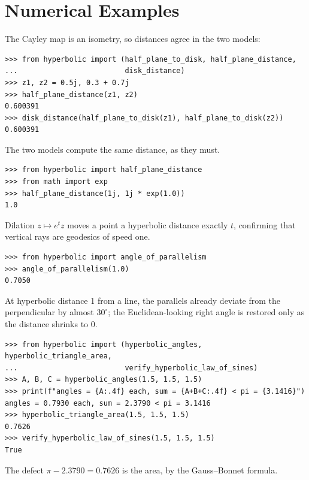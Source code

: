\section{Numerical Examples}

\begin{example}
The Cayley map is an isometry, so distances agree in the two models:
\begin{lstlisting}[style=python]
>>> from hyperbolic import (half_plane_to_disk, half_plane_distance,
...                         disk_distance)
>>> z1, z2 = 0.5j, 0.3 + 0.7j
>>> half_plane_distance(z1, z2)
0.600391
>>> disk_distance(half_plane_to_disk(z1), half_plane_to_disk(z2))
0.600391
\end{lstlisting}
The two models compute the same distance, as they must.
\end{example}

\begin{example}
\begin{lstlisting}[style=python]
>>> from hyperbolic import half_plane_distance
>>> from math import exp
>>> half_plane_distance(1j, 1j * exp(1.0))
1.0
\end{lstlisting}
Dilation $z \mapsto e^t z$ moves a point a hyperbolic distance exactly $t$, confirming that vertical rays are geodesics of speed one.
\end{example}

\begin{example}
\begin{lstlisting}[style=python]
>>> from hyperbolic import angle_of_parallelism
>>> angle_of_parallelism(1.0)
0.7050
\end{lstlisting}
At hyperbolic distance 1 from a line, the parallels already deviate from the perpendicular by almost $30^\circ$; the Euclidean-looking right angle is restored only as the distance shrinks to 0.
\end{example}

\begin{example}
\begin{lstlisting}[style=python]
>>> from hyperbolic import (hyperbolic_angles, hyperbolic_triangle_area,
...                         verify_hyperbolic_law_of_sines)
>>> A, B, C = hyperbolic_angles(1.5, 1.5, 1.5)
>>> print(f"angles = {A:.4f} each, sum = {A+B+C:.4f} < pi = {3.1416}")
angles = 0.7930 each, sum = 2.3790 < pi = 3.1416
>>> hyperbolic_triangle_area(1.5, 1.5, 1.5)
0.7626
>>> verify_hyperbolic_law_of_sines(1.5, 1.5, 1.5)
True
\end{lstlisting}
The defect $\pi - 2.3790 = 0.7626$ is the area, by the Gauss--Bonnet formula.
\end{example}

